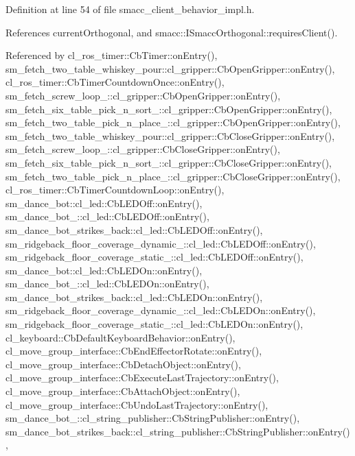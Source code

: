 Definition at line 54 of file smacc\+\_\+client\+\_\+behavior\+\_\+impl.\+h.



References current\+Orthogonal, and smacc\+::\+I\+Smacc\+Orthogonal\+::requires\+Client().



Referenced by cl\+\_\+ros\+\_\+timer\+::\+Cb\+Timer\+::on\+Entry(), sm\+\_\+fetch\+\_\+two\+\_\+table\+\_\+whiskey\+\_\+pour\+::cl\+\_\+gripper\+::\+Cb\+Open\+Gripper\+::on\+Entry(), cl\+\_\+ros\+\_\+timer\+::\+Cb\+Timer\+Countdown\+Once\+::on\+Entry(), sm\+\_\+fetch\+\_\+screw\+\_\+loop\+\_\+::cl\+\_\+gripper\+::\+Cb\+Open\+Gripper\+::on\+Entry(), sm\+\_\+fetch\+\_\+six\+\_\+table\+\_\+pick\+\_\+n\+\_\+sort\+\_\+::cl\+\_\+gripper\+::\+Cb\+Open\+Gripper\+::on\+Entry(), sm\+\_\+fetch\+\_\+two\+\_\+table\+\_\+pick\+\_\+n\+\_\+place\+\_\+::cl\+\_\+gripper\+::\+Cb\+Open\+Gripper\+::on\+Entry(), sm\+\_\+fetch\+\_\+two\+\_\+table\+\_\+whiskey\+\_\+pour\+::cl\+\_\+gripper\+::\+Cb\+Close\+Gripper\+::on\+Entry(), sm\+\_\+fetch\+\_\+screw\+\_\+loop\+\_\+::cl\+\_\+gripper\+::\+Cb\+Close\+Gripper\+::on\+Entry(), sm\+\_\+fetch\+\_\+six\+\_\+table\+\_\+pick\+\_\+n\+\_\+sort\+\_\+::cl\+\_\+gripper\+::\+Cb\+Close\+Gripper\+::on\+Entry(), sm\+\_\+fetch\+\_\+two\+\_\+table\+\_\+pick\+\_\+n\+\_\+place\+\_\+::cl\+\_\+gripper\+::\+Cb\+Close\+Gripper\+::on\+Entry(), cl\+\_\+ros\+\_\+timer\+::\+Cb\+Timer\+Countdown\+Loop\+::on\+Entry(), sm\+\_\+dance\+\_\+bot\+::cl\+\_\+led\+::\+Cb\+L\+E\+D\+Off\+::on\+Entry(), sm\+\_\+dance\+\_\+bot\+\_\+::cl\+\_\+led\+::\+Cb\+L\+E\+D\+Off\+::on\+Entry(), sm\+\_\+dance\+\_\+bot\+\_\+strikes\+\_\+back\+::cl\+\_\+led\+::\+Cb\+L\+E\+D\+Off\+::on\+Entry(), sm\+\_\+ridgeback\+\_\+floor\+\_\+coverage\+\_\+dynamic\+\_\+::cl\+\_\+led\+::\+Cb\+L\+E\+D\+Off\+::on\+Entry(), sm\+\_\+ridgeback\+\_\+floor\+\_\+coverage\+\_\+static\+\_\+::cl\+\_\+led\+::\+Cb\+L\+E\+D\+Off\+::on\+Entry(), sm\+\_\+dance\+\_\+bot\+::cl\+\_\+led\+::\+Cb\+L\+E\+D\+On\+::on\+Entry(), sm\+\_\+dance\+\_\+bot\+\_\+::cl\+\_\+led\+::\+Cb\+L\+E\+D\+On\+::on\+Entry(), sm\+\_\+dance\+\_\+bot\+\_\+strikes\+\_\+back\+::cl\+\_\+led\+::\+Cb\+L\+E\+D\+On\+::on\+Entry(), sm\+\_\+ridgeback\+\_\+floor\+\_\+coverage\+\_\+dynamic\+\_\+::cl\+\_\+led\+::\+Cb\+L\+E\+D\+On\+::on\+Entry(), sm\+\_\+ridgeback\+\_\+floor\+\_\+coverage\+\_\+static\+\_\+::cl\+\_\+led\+::\+Cb\+L\+E\+D\+On\+::on\+Entry(), cl\+\_\+keyboard\+::\+Cb\+Default\+Keyboard\+Behavior\+::on\+Entry(), cl\+\_\+move\+\_\+group\+\_\+interface\+::\+Cb\+End\+Effector\+Rotate\+::on\+Entry(), cl\+\_\+move\+\_\+group\+\_\+interface\+::\+Cb\+Detach\+Object\+::on\+Entry(), cl\+\_\+move\+\_\+group\+\_\+interface\+::\+Cb\+Execute\+Last\+Trajectory\+::on\+Entry(), cl\+\_\+move\+\_\+group\+\_\+interface\+::\+Cb\+Attach\+Object\+::on\+Entry(), cl\+\_\+move\+\_\+group\+\_\+interface\+::\+Cb\+Undo\+Last\+Trajectory\+::on\+Entry(), sm\+\_\+dance\+\_\+bot\+\_\+::cl\+\_\+string\+\_\+publisher\+::\+Cb\+String\+Publisher\+::on\+Entry(), sm\+\_\+dance\+\_\+bot\+\_\+strikes\+\_\+back\+::cl\+\_\+string\+\_\+publisher\+::\+Cb\+String\+Publisher\+::on\+Entry(), 